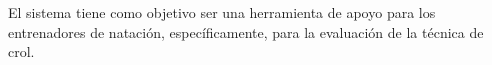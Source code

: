 El sistema tiene como objetivo ser una herramienta de apoyo para los entrenadores 
de natación, específicamente, para la evaluación de la técnica de crol.
